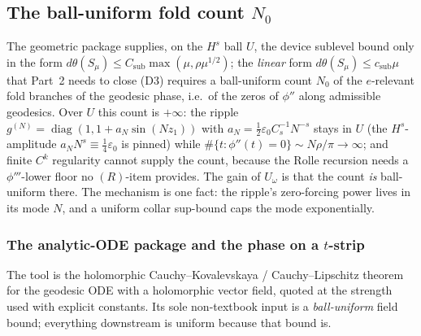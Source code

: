 \subsection{The ball-uniform fold count \texorpdfstring{$N_0$}{N-0}}
\label{an17:sub-N0}

The geometric package supplies, on the $H^s$ ball $U$, the device sublevel bound
only in the form $d\theta(S_\mu)\le C_{\mathrm{sub}}\max(\mu,\rho\mu^{1/2})$; the
\emph{linear} form $d\theta(S_\mu)\le c_{\mathrm{sub}}\mu$ that Part~2 needs to
close (D3) requires a ball-uniform count $N_0$ of the $e$-relevant fold branches
of the geodesic phase, i.e.\ of the zeros of $\phi''$ along admissible geodesics.
Over $U$ this count is $+\infty$: the ripple $g^{(N)}=\operatorname{diag}(1,
1+a_N\sin(Nz_1))$ with $a_N=\tfrac12\varepsilon_0 C_s^{-1}N^{-s}$ stays in $U$
(the $H^s$-amplitude $a_NN^s\equiv\tfrac14\varepsilon_0$ is pinned) while
$\#\{t:\phi''(t)=0\}\sim N\rho/\pi\to\infty$; and finite $C^k$ regularity cannot
supply the count, because the Rolle recursion needs a $\phi'''$-lower floor no
$(R)$-item provides. The gain of $U_\omega$ is that the count \emph{is} ball-uniform
there. The mechanism is one fact: the ripple's zero-forcing power lives in its
mode $N$, and a uniform collar sup-bound caps the mode exponentially.

\subsubsection*{The analytic-ODE package and the phase on a
\texorpdfstring{$t$}{t}-strip}

The tool is the holomorphic Cauchy--Kovalevskaya / Cauchy--Lipschitz theorem for
the geodesic ODE with a holomorphic vector field, quoted at the strength used
with explicit constants. Its sole non-textbook input is a \emph{ball-uniform}
field bound; everything downstream is uniform because that bound is.

